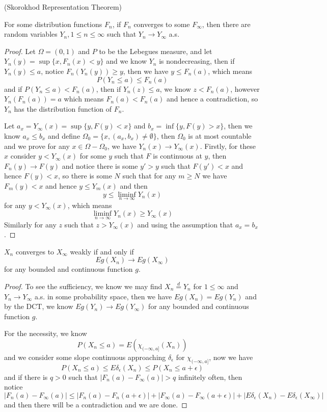 \begin{theorem}
    (Skorokhod Representation Theorem)\par
    For some distribution functions $F_n$, if $F_n$ converges to some $F_{\infty}$, then there are random variables $Y_n, 1\leq n \leq \infty$ such that $Y_n \to Y_{\infty} $ a.s.
\end{theorem}
\begin{proof}
    Let $\Omega = (0,1)$ and $P$ to be the Lebegues measure, and let $Y_n(y) = \sup\{x, F_n(x)< y\}$ and we know $Y_n$ is nondecreasing, then if $Y_n(y) \leq a$,  notice $F_n(Y_n(y)) \geq y$, then we have $y \leq F_n(a)$, which means
    \[
    P(Y_n \leq a) \leq F_n(a)
    \]
    and if $P(Y_n \leq a) < F_n(a)$, then if $Y_n(z) \leq a$, we know $z < F_n(a)$, however $Y_n(F_n(a)) = a$ which means $F_n(a) < F_n(a)$ and hence a contradiction, so $Y_n$ has the distribution function of $F_n$.\par
    Let $a_x = Y_{\infty}(x) = \sup\{y, F(y) < x\}$ and $b_x = \inf \{y, F(y) > x\}$, then we know $a_x \leq b_x$ and define $\Omega_0 = \{x, (a_x,b_x) \neq \emptyset\}$, then $\Omega_0$ is at most countable and we prove for any $x \in \Omega - \Omega_0$, we have $Y_n(x) \to Y_{\infty}(x)$. Firstly, for these $x$ consider $y < Y_{\infty}(x)$ for some $y$ such that $F$ is continuous at $y$, then $F_n(y) \to F(y)$ and notice there is some $y' > y$ such that $F(y')  <x$ and hence $F(y) < x$, so there is some $N$ such that for any $m\geq N$ we have $F_m(y) < x$ and hence $y \leq Y_m(x)$ and then
    \[
    y \leq \liminf_{n\to\infty} Y_n(x)
    \]
    for any $y < Y_{\infty}(x)$, which means
    \[
    \liminf_{n\to\infty} Y_n(x) \geq Y_{\infty}(x)
    \]
    Similarly for any $z$ such that $z > Y_{\infty}(x)$ and using the assumption that $a_x = b_x$.
\end{proof}

\begin{theorem}
    $X_n$ converges to $X_{\infty}$ weakly if and only if
    \[Eg(X_n) \to Eg(X_{\infty})\]
    for any bounded and continuous function $g$.
\end{theorem}
\begin{proof}
    To see the sufficiency, we know we may find $X_n \overset{d}{=} Y_n$ for $1\leq \infty$ and $Y_n \to Y_{\infty}$ a.s. in some probability space, then  we have $Eg(X_n) = Eg(Y_n)$ and by the DCT, we know $Eg(Y_n) \to Eg(Y_{\infty})$ for any bounded and continuous function $g$.\par
    For the necessity, we know
    \[
    P(X_n \leq a) = E(\chi_{(-\infty,a]}(X_n))
    \]
    and we consider some slope continuous approaching $\delta_{\epsilon}$ for $\chi_{(-\infty,a]}$, now we have
    \[
    P(X_n \leq a)\leq E\delta_{\epsilon}(X_n) \leq P(X_n \leq a+\epsilon)
    \]
    and if there is $q > 0$ such that $|F_n(a) - F_{\infty}(a)| > q$ infinitely often, then notice
    \[
    |F_n(a) - F_{\infty}(a)| \leq|F_n(a) - F_{n}(a+\epsilon)| + |F_{\infty}(a) - F_{\infty}(a+\epsilon)| + |E\delta_{\epsilon}(X_n)-E\delta_{\epsilon}(X_{\infty})|
    \]
    and then there will be a contradiction and we are done.
\end{proof}


